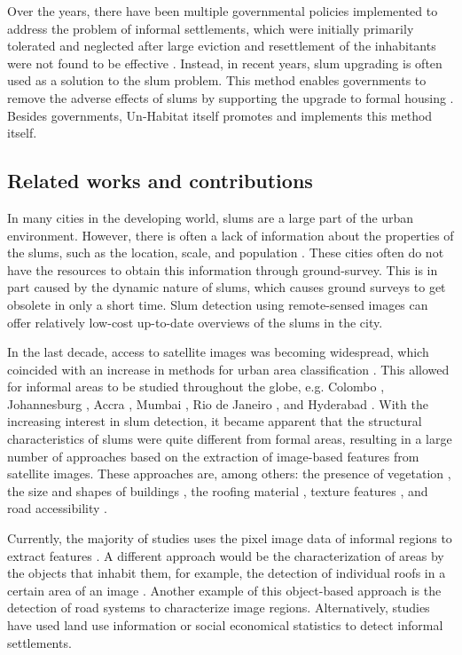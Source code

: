 Over the years, there have been multiple governmental policies implemented to address the problem of informal settlements, which were initially primarily tolerated and neglected after large eviction and resettlement of the inhabitants were not found to be effective \cite{kuffer2016slums}. Instead, in recent years, slum upgrading is often used as a solution to the slum problem. This method enables governments to remove the adverse effects of slums by supporting the upgrade to formal housing \cite{cobbett2013cities}. Besides governments, Un-Habitat itself promotes and implements this method itself\cite{2015globact}.

\subsection{Related works and contributions}
In many cities in the developing world, slums are a large part of the urban environment. However, there is often a lack of information about the properties of the slums, such as the location, scale, and population \cite{kuffer2016slums}. These cities often do not have the resources to obtain this information through ground-survey. This is in part caused by the dynamic nature of slums, which causes ground surveys to get obsolete in only a short time. Slum detection using remote-sensed images can offer relatively low-cost up-to-date overviews of the slums in the city.

In the last decade, access to satellite images was becoming widespread, which coincided with an increase in methods for urban area classification \cite{kuffer2016slums}. This allowed for informal areas to be studied throughout the globe, e.g. Colombo \cite{colombo}, Johannesburg \cite{williams2016automatic}, Accra \cite{accra}, Mumbai \cite{mumbai}, Rio de Janeiro \cite{hofmann2008detecting}, and Hyderabad \cite{hyderabad}. With the increasing interest in slum detection, it became apparent that the structural characteristics of slums were quite different from formal areas, resulting in a large number of approaches based on the extraction of image-based features from satellite images. These approaches are, among others: the presence of vegetation \cite{niebergall2007object}, the size and shapes of buildings \cite{hofmann2008detecting}, the roofing material \cite{williams2016automatic}, texture features \cite{mattia2007exploiting}, and road accessibility \cite{owen2013approach}.

Currently, the majority of studies uses the pixel image data of informal regions to extract features \cite{kuffer2016slums}. A different approach would be the characterization of areas by the objects that inhabit them, for example, the detection of individual roofs in a certain area of an image \cite{williams2016automatic}. Another example of this object-based approach is the detection of road systems to characterize image regions. Alternatively, studies have used land use information \cite{novack2010urban} or social economical statistics \cite{engstrom2011using} to detect informal settlements.

